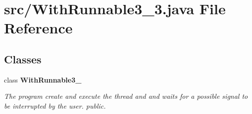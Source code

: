 \section{src/\+With\+Runnable3\+\_\+3.java File Reference}
\label{_with_runnable3__3_8java}
\subsection*{Classes}
\begin{DoxyCompactItemize}
\item 
class {\bf With\+Runnable3\+\_}
\begin{DoxyCompactList}\small\item\em The program create and execute the thread and and waits for a possible signal to be interrupted by the user.  public. \end{DoxyCompactList}\end{DoxyCompactItemize}
